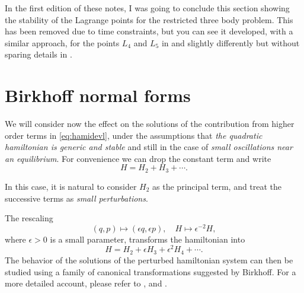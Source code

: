 \documentclass[english,fontsize=11pt,paper=b5]{scrbook}
\numberwithin{equation}{chapter}
\theoremstyle{definition}
\begin{document}
      In the first edition of these notes, I was going to conclude this section showing the stability of the Lagrange points for the restricted three body problem.
      This has been removed due to time constraints, but you can see it developed, with a similar approach, for the points $L_4$ and $L_5$ in \cite[Chapter 2.10]{book:lowenstein} and slightly differently but without sparing details in \cite{book:arnoldcelestial,book:celletti}.

      \section{Birkhoff normal forms}

      We will consider now the effect on the solutions of the contribution from higher order terms in \eqref{eq:hamidevl}, under the assumptions that \emph{the quadratic hamiltonian is generic and stable} and still in the case of \emph{small oscillations near an equilibrium}.
      For convenience we can drop the constant term and write
      \begin{equation}
        H = H_2 + H_3 + \cdots.
      \end{equation}

      In this case, it is natural to consider $H_2$ as the principal term, and treat the successive terms as \emph{small perturbations}.

      The rescaling
      \begin{equation}
        (q, p)\mapsto (\epsilon q, \epsilon p), \quad H \mapsto \epsilon^{-2} H,
      \end{equation}
      where $\epsilon > 0$ is a small parameter, transforms the hamiltonian into
      \begin{equation}
        H = H_2 + \epsilon H_3 + \epsilon^2 H_4 + \cdots.
      \end{equation}
      The behavior of the solutions of the perturbed hamiltonian system can then be studied using a family of canonical transformations suggested by Birkhoff.
      For a more detailed account, please refer to \cite[Chapter 6.5]{book:celletti}, \cite[Chapter 8.3]{book:arnoldcelestial} and \cite[Chapters 15.2 and 15.3]{book:knauf}.
\end{document}
